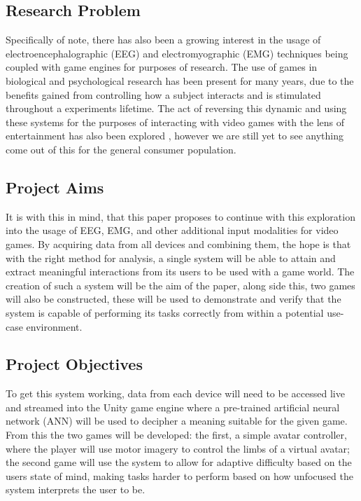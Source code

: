 \documentclass[11pt, a4paper]{article}
\begin{document}
\subsection{Research Problem}
Specifically of note, there has also been a growing interest in the usage of electroencephalographic (EEG) and electromyographic (EMG) techniques being coupled with game engines for purposes of research. The use of games in biological and psychological research has been present for many years, due to the benefits gained from controlling how a subject interacts and is stimulated throughout a experiments lifetime. The act of reversing this dynamic and using these systems for the purposes of interacting with video games with the lens of entertainment has also been explored \cite{6518141}, however we are still yet to see anything come out of this for the general consumer population. 

\subsection{Project Aims}
It is with this in mind, that this paper proposes to continue with this exploration into the usage of EEG, EMG, and other additional input modalities for video games. By acquiring data from all devices and combining them, the hope is that with the right method for analysis, a single system will be able to attain and extract meaningful interactions from its users to be used with a game world. The creation of such a system will be the aim of the paper, along side this, two games will also be constructed, these will be used to demonstrate and verify that the system is capable of performing its tasks correctly from within a potential use-case environment.

\subsection{Project Objectives}
To get this system working, data from each device will need to be accessed live and streamed into the Unity game engine where a pre-trained artificial neural network (ANN) will be used to decipher a meaning suitable for the given game. From this the two games will be developed: the first, a simple avatar controller, where the player will use motor imagery to control the limbs of a virtual avatar; the second game will use the system to allow for adaptive difficulty based on the users state of mind, making tasks harder to perform based on how unfocused the system interprets the user to be.
\end{document}

